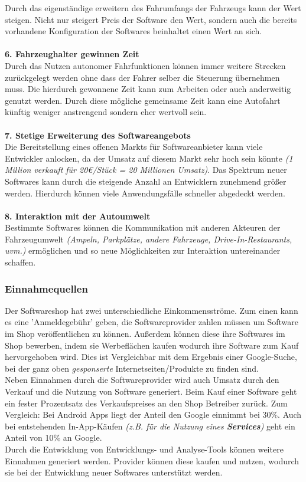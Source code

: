 Durch das eigenständige erweitern des Fahrumfangs der Fahrzeugs kann der Wert steigen. Nicht nur steigert Preis der Software den Wert, sondern auch die bereits vorhandene Konfiguration der Softwares beinhaltet einen Wert an sich.\\\\
\textbf{6. Fahrzeughalter gewinnen Zeit}\\
Durch das Nutzen autonomer Fahrfunktionen können immer weitere Strecken zurückgelegt werden ohne dass der Fahrer selber die Steuerung übernehmen muss. Die hierdurch gewonnene Zeit kann zum Arbeiten oder auch anderweitig genutzt werden. Durch diese mögliche gemeinsame Zeit kann eine Autofahrt künftig weniger anstrengend sondern eher wertvoll sein.\\\\
\textbf{7. Stetige Erweiterung des Softwareangebots}\\
Die Bereitstellung eines offenen Markts für Softwareanbieter kann viele Entwickler anlocken, da der Umsatz auf diesem Markt sehr hoch sein könnte \textit{(1 Million verkauft für 20€/Stück = 20 Millionen Umsatz)}. Das Spektrum neuer Softwares kann durch die steigende Anzahl an Entwicklern zunehmend größer werden. Hierdurch können viele Anwendungsfälle schneller abgedeckt werden.\\\\
\textbf{8. Interaktion mit der Autoumwelt}\\
Bestimmte Softwares können die Kommunikation mit anderen Akteuren der Fahrzeugumwelt \textit{(Ampeln, Parkplätze, andere Fahrzeuge, Drive-In-Restaurants, uvm.)} ermöglichen und so neue Möglichkeiten zur Interaktion untereinander schaffen.

\subsubsection{Einnahmequellen}
Der Softwareshop hat zwei unterschiedliche Einkommensströme. Zum einen kann es eine 'Anmeldegebühr' geben, die Softwareprovider zahlen müssen um Software im Shop veröffentlichen zu können. Außerdem können diese ihre Softwares im Shop bewerben, indem sie Werbeflächen kaufen wodurch ihre Software zum Kauf hervorgehoben wird. Dies ist Vergleichbar mit dem Ergebnis einer Google-Suche, bei der ganz oben \textit{gesponserte} Internetseiten/Produkte zu finden sind.\\
Neben Einnahmen durch die Softwareprovider wird auch Umsatz durch den Verkauf und die Nutzung von Software generiert. Beim Kauf einer Software geht ein fester Prozentsatz des Verkaufspreises an den Shop Betreiber zurück. Zum Vergleich: Bei Android Apps liegt der Anteil den Google einnimmt bei 30\%. Auch bei entstehenden In-App-Käufen \textit{(z.B. für die Nutzung eines \textbf{Services})} geht ein Anteil von 10\% an Google.\\
Durch die Entwicklung von Entwicklungs- und Analyse-Tools können weitere Einnahmen generiert werden. Provider können diese kaufen und nutzen, wodurch sie bei der Entwicklung neuer Softwares unterstützt werden.


